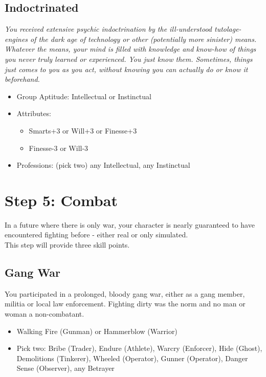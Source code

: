 	\subsection{Indoctrinated}
	\textit{You received extensive psychic indoctrination by the ill-understood tutolage-engines of the dark age of technology or other (potentially more sinister) means. Whatever the means, your mind is filled with knowledge and know-how of things you never truly learned or experienced. You just know them. Sometimes, things just comes to you as you act, without knowing you can actually do or know it beforehand.}
	\begin{itemize}
		\item Group Aptitude: Intellectual or Instinctual
		\item Attributes:
		\begin{itemize}
			\item Smarts+3 or Will+3 or Finesse+3
			\item Finesse-3 or Will-3
		\end{itemize}
		\item Professions: (pick two) any Intellectual, any Instinctual
	\end{itemize}



\section{Step 5: Combat} %
	\label{sec:lifepath_5_combat}
	In a future where there is only war, your character is nearly guaranteed to have encountered fighting before - either real or only simulated.\\
	This step will provide three skill points.

	\subsection{Gang War}
	You participated in a prolonged, bloody gang war, either as a gang member, militia or local law enforcement. Fighting dirty was the norm and no man or woman a non-combatant.
	\begin{itemize}
		\item Walking Fire (Gunman) or Hammerblow (Warrior)
		\item Pick two: Bribe (Trader), Endure (Athlete), Warcry (Enforcer), Hide (Ghost), Demolitions (Tinkerer), Wheeled (Operator), Gunner (Operator), Danger Sense (Observer), any Betrayer
	\end{itemize}

